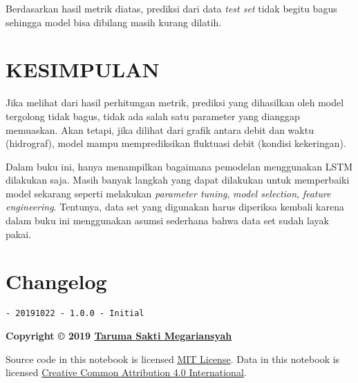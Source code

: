 \documentclass[11pt]{article}
\let\oldsection\section
\renewcommand\section{\clearpage\oldsection}
\begin{document}
    Berdasarkan hasil metrik diatas, prediksi dari data \emph{test set}
tidak begitu bagus sehingga model bisa dibilang masih kurang dilatih.

    \hypertarget{kesimpulan}{%
\section{KESIMPULAN}\label{kesimpulan}}

    Jika melihat dari hasil perhitungan metrik, prediksi yang dihasilkan
oleh model tergolong tidak bagus, tidak ada salah satu parameter yang
dianggap memuaskan. Akan tetapi, jika dilihat dari grafik antara debit
dan waktu (hidrograf), model mampu memprediksikan fluktuasi debit
(kondisi kekeringan).

Dalam buku ini, hanya menampilkan bagaimana pemodelan menggunakan LSTM
dilakukan saja. Masih banyak langkah yang dapat dilakukan untuk
memperbaiki model sekarang seperti melakukan \emph{parameter tuning},
\emph{model selection}, \emph{feature engineering}. Tentunya, data set
yang digunakan harus diperiksa kembali karena dalam buku ini menggunakan
asumsi sederhana bahwa data set sudah layak pakai.

    \hypertarget{changelog}{%
\section{Changelog}\label{changelog}}

\begin{verbatim}
- 20191022 - 1.0.0 - Initial
\end{verbatim}

\textbf{Copyright © 2019 \href{https://taruma.github.io}{Taruma Sakti
Megariansyah}}

Source code in this notebook is licensed
\href{https://github.com/taruma/vivaldi/blob/master/LICENSE}{MIT
License}. Data in this notebook is licensed
\href{https://creativecommons.org/licenses/by/4.0/}{Creative Common
Attribution 4.0 International}.


    
    
    
\end{document}
